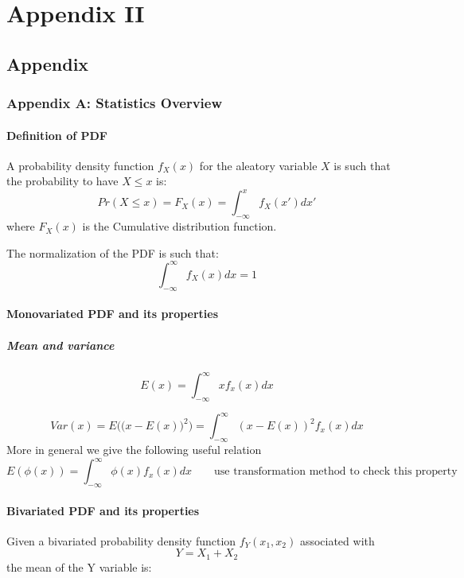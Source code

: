 \chapter{Appendix II}

\section{Appendix}

\subsection{Appendix A: Statistics Overview}

\subsubsection{Definition of PDF}
A probability density function $f_{X}(x)$ for the  aleatory variable $X$ is such that the probability to have $X \leq x$ is:
\[Pr(X\leq x)= F_{X}(x)=\int_{-\infty}^{x}f_{X}(x')dx'\]
where $F_{X}(x)$ is the Cumulative distribution function.

The normalization of the PDF is such that:
\[\int_{-\infty}^{\infty}f_{X}(x)dx=1\]
\subsubsection{Monovariated PDF and its properties}

\paragraph{Mean and variance}
\[E(x)=\int_{-\infty}^{\infty}xf_{x}(x)dx\]

\[Var(x)=E\Big(\big(x-E(x)\big)^2\Big)=\int_{-\infty}^{\infty}(x-E(x))^2f_{x}(x)dx\]
More in general we give the following useful relation
\begin{equation}
    E(\phi(x))=\int_{-\infty}^{\infty}\phi(x)f_{x}(x)dx \qquad \mbox{use transformation method to check this property}
    \label{eq:MEANPHY}
\end{equation}




\subsubsection{Bivariated PDF and its properties}
Given a bivariated probability density function $f_{Y}(x_{1},x_{2})$ associated with \[Y=X_{1}+X_{2}\]
the mean of the Y variable is:

